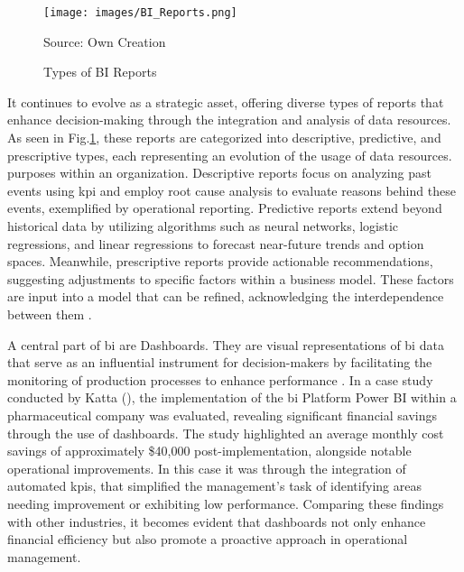 \begin{figure}[h]
    \centering
    \texttt{[image: images/BI\_Reports.png]}
    \caption{Types of BI Reports}
    \label{fig:types_of_bi_reports}
    \begin{flushleft}
        \small{Source: Own Creation}
    \end{flushleft}    
\end{figure}

It continues to evolve as a strategic asset, offering 
diverse types of reports that enhance decision-making 
through the integration and analysis of data resources. 
As seen in Fig.\ref{fig:types_of_bi_reports}, these reports are categorized into descriptive, 
predictive, and prescriptive types, each representing an evolution
of the usage of data resources.
purposes within an organization. 
Descriptive reports focus on analyzing past events using 
\gls{kpi} and employ root cause 
analysis to evaluate reasons behind these events, 
exemplified by operational reporting. Predictive reports 
extend beyond historical data by utilizing algorithms
such as neural networks, logistic regressions, and 
linear regressions to forecast near-future trends and option spaces. 
Meanwhile, prescriptive reports provide actionable 
recommendations, suggesting adjustments to specific 
factors within a business model. These factors are 
input into a model that can be refined, acknowledging 
the interdependence between them \autocite[pp. 308-310]{kumarBusinessIntelligence2024}.
 
A central part of \gls{bi} are Dashboards. They are visual
representations of \gls{bi} data that serve as an influential instrument for 
decision-makers by facilitating the monitoring of 
production processes to enhance performance 
\autocite[p. 407]{belghithDataVisualizationIndustry2023}. 
In a case study conducted by Katta (\citeyear[p.68]{kattaLeveragingPowerBI2025}), 
the implementation of the \gls{bi} Platform Power BI within a 
pharmaceutical company was evaluated, revealing significant financial 
savings through the use of dashboards. 
The study highlighted 
an average monthly cost savings of approximately \$40,000 
post-implementation, alongside notable operational 
improvements. In this case it was through the integration 
of automated \gls{kpi}s, that simplified 
the management's task of identifying areas needing 
improvement or exhibiting low performance. Comparing 
these findings with other industries, it becomes evident 
that dashboards not only enhance financial efficiency but 
also promote a proactive approach in operational 
management.



